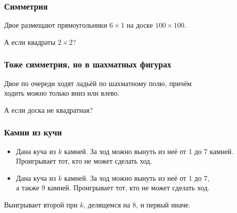 \begin{frame} \frametitle{Симметрия}
	Двое размещают прямоугольники $6 \times 1$ на доске $100 \times 100$. \medskip \pause

\begin{center}  \end{center}\medskip

	А если квадраты $2 \times 2$?
\end{frame}

\begin{frame} \frametitle{Тоже симметрия, но в шахматных фигурах}
	Двое по очереди ходят ладьёй по шахматному полю, причём \\
	ходить можно только вниз или влево. \medskip \pause

\begin{center}  \end{center}\medskip

	А если доска не квадратная?
\end{frame}

\begin{frame} \frametitle{Камни из кучи}
\begin{itemize} \itemsep=4mm
	\item Дана куча из $k$ камней. За ход можно вынуть из неё от 1 до 7 камней. Проигрывает тот, кто не может сделать ход.
	\item Дана куча из $k$ камней. За ход можно вынуть из неё от 1 до 7, \\ а также 9 камней. Проигрывает тот, кто не может сделать ход.
\end{itemize} \bigskip \pause

Выигрывает второй при $k$, делящемся на 8, и первый иначе.
\end{frame}
